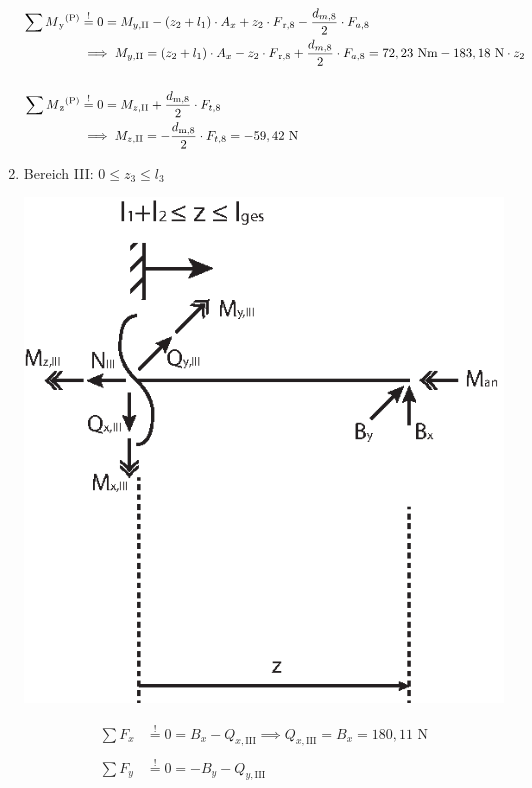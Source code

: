\begin{enumerate}
\begin{align*}
		\sum M\textsubscript{y}\textsuperscript{(P)} &\overset{!}{=} 0 = M_{y,\mathrm{II}} - (z_2 +l_1) \cdot A_x + z_2 \cdot F\textsubscript{r,8} - \frac{d_{m,8}}{2} \cdot F_{a,8} \\
				&\implies M_{y,\mathrm{II}} = (z_2+l_1) \cdot A_x -z_2 \cdot F\textsubscript{r,8} + \frac{d_{m,8}}{2} \cdot F_{a,8} = 72,23\text{ Nm} - 183,18 \text{ N} \cdot z_2\\ \\
		\sum M\textsubscript{z}\textsuperscript{(P)} &\overset{!}{=} 0 = M_{z,\mathrm{II}} + \frac{d\textsubscript{m,8} }{2} \cdot F_{t,8} \\ 
				&\implies M_{z,\mathrm{II}} = -\frac{d\textsubscript{m,8}}{2} \cdot F_{t,8}= -59,42 \text{ N}\\
			\end{align*}
\newpage
\item Bereich III: $0 \leq z_3 \leq l_3$
\begin{center}
	\includegraphics{figures/Bereich_3}
\end{center}
	\begin{align*}
        \sum F_x &\overset{!}{=} 0 = B_x - Q_{x,\mathrm{III}} 
				\implies  Q_{x,\mathrm{III}} = B_x = 180,11 \text { N}\\ \\
        \sum F_y &\overset{!}{=} 0 =- B_y - Q_{y,\mathrm{III}} 

\end{align*}
\end{enumerate}
